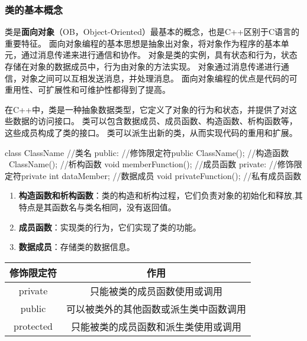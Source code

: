 \subsubsection{类的基本概念}

类是\textbf{面向对象}（OB，Object-Oriented）最基本的概念，也是C++区别于C语言的重要特征。
面向对象编程的基本思想是抽象出对象，将对象作为程序的基本单元，通过消息传递来进行通信和协作。
对象是类的实例，具有状态和行为，状态存储在对象的数据成员中，行为由对象的方法实现。
对象通过消息传递进行通信，对象之间可以互相发送消息，并处理消息。
面向对象编程的优点是代码的可重用性、可扩展性和可维护性都得到了提高。

在C++中，类是一种抽象数据类型，它定义了对象的行为和状态，并提供了对这些数据的访问接口。
类可以包含数据成员、成员函数、构造函数、析构函数等，这些成员构成了类的接口。
类可以派生出新的类，从而实现代码的重用和扩展。

\begin{tcode}
class ClassName{        //类名
    public:             //修饰限定符public
        ClassName();    //构造函数
        ~ClassName();   //析构函数
        void memberFunction();  //成员函数
    private:                    //修饰限定符private
        int dataMember;         //数据成员
        void privateFunction(); //私有成员函数
}    

\end{tcode}

\begin{enumerate}
    \item \textbf{构造函数和析构函数}：类的构造和析构过程，它们负责对象的初始化和释放,其特点是其函数名与类名相同，没有返回值。
    \item \textbf{成员函数}：实现类的行为，它们实现了类的功能。
    \item \textbf{数据成员}：存储类的数据信息。
\end{enumerate}
\begin{center}

    \begin{tabular}{cc}
        \hline
        修饰限定符 & 作用 \\
        \hline
        private & 只能被类的成员函数使用或调用 \\
        public & 可以被类外的其他函数或派生类中函数调用 \\
        protected & 只能被类的成员函数和派生类使用或调用 \\ 
        \hline
        
    \end{tabular}
\end{center}

